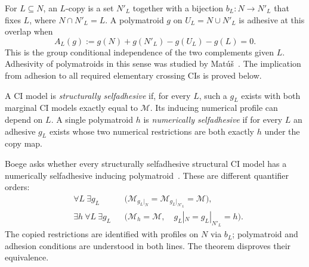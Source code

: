 \documentclass[11pt]{article}
\newcommand{\M}{\mathcal M}\newcommand{\st}{\mathfrak{st}}
\begin{document}
For $L\subseteq N$, an $L$-copy is a set $N'_L$ together with a bijection
$b_L:N\to N'_L$ that fixes $L$, where $N\cap N'_L=L$. A polymatroid $g$ on
$U_L=N\cup N'_L$ is adhesive at this overlap when
\begin{equation}\label{eq:adhesion}
 A_L(g):=g(N)+g(N'_L)-g(U_L)-g(L)=0.
\end{equation}
This is the group conditional independence of the two complements given $L$.
Adhesivity of polymatroids in this sense was studied by Mat\'u\v{s}~\cite{Matus}.
The implication from adhesion to all required elementary crossing CIs is proved below.

A CI model is \emph{structurally selfadhesive} if, for every $L$, such a $g_L$
exists with both marginal CI models exactly equal to $\M$. Its inducing
numerical profile can depend on $L$. A single polymatroid $h$ is
\emph{numerically selfadhesive} if for every $L$ an adhesive $g_L$ exists whose
two numerical restrictions are both exactly $h$ under the copy map.

Boege asks whether every structurally selfadhesive structural CI model has a
numerically selfadhesive inducing polymatroid~\cite[Question~4.18 in the HTML;
Question~4.14 in the PDF]{Boege}. These are different quantifier orders:
\[
 \begin{aligned}
 &\forall L\ \exists g_L
   &&\bigl(\M_{g_L|_N}=\M_{g_L|_{N'_L}}=\M\bigr),\\
 &\exists h\ \forall L\ \exists g_L
   &&\bigl(\M_h=\M,\quad g_L|_N=g_L|_{N'_L}=h\bigr).
 \end{aligned}
\]
The copied restrictions are identified with profiles on $N$ via $b_L$;
polymatroid and adhesion conditions are understood in both lines.
The theorem disproves their equivalence.
\end{document}

